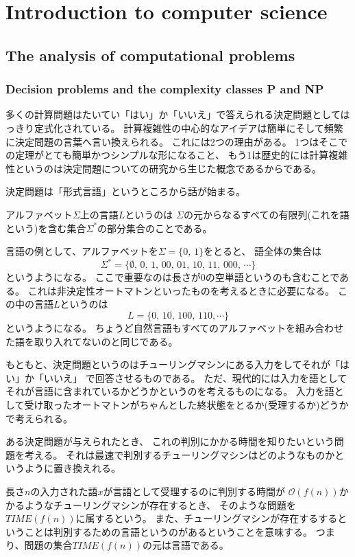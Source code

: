 \documentclass[../../master.tex]{subfiles}
\begin{document}
\setcounter{chapter}{2}
\chapter{Introduction to computer science}
\setcounter{section}{1}
\section{The analysis of computational problems}
\setcounter{subsection}{2}
\subsection{Decision problems and the complexity classes P and NP}
多くの計算問題はたいてい「はい」か「いいえ」で答えられる決定問題としてはっきり定式化されている。
計算複雑性の中心的なアイデアは簡単にそして頻繁に決定問題の言葉へ言い換えられる。
これには2つの理由がある。
1つはそこでの定理がとても簡単かつシンプルな形になること、
もう1は歴史的には計算複雑性というのは決定問題についての研究から生じた概念であるからである。

決定問題は「形式言語」というところから話が始まる。
\begin{tcolorbox}[title = 形式言語]
    アルファベット\(\Sigma\)上の言語\(L\)というのは
    \(\Sigma\)の元からなるすべての有限列(これを語という)を含む集合\(\Sigma^*\)の部分集合のことである。
\end{tcolorbox}
言語の例として、アルファベットを\(\Sigma=\{0,\,1\}\)をとると、
語全体の集合は
\[
    \Sigma^*=\{\emptyset,\,0,\,1,\,00,\,01,\,10,\,11,\,000,\,\cdots\}
\]
というようになる。
ここで重要なのは長さが0の空単語というのも含むことである。
これは非決定性オートマトンといったものを考えるときに必要になる。
この中の言語\(L\)というのは
\[
    L = \{0,\,10,\,100,\,110, \cdots\}
\]
というようになる。
ちょうど自然言語もすべてのアルファベットを組み合わせた語を取り入れてないのと同じである。

もともと、決定問題というのはチューリングマシンにある入力をしてそれが「はい」か「いいえ」
で回答させるものである。
ただ、現代的には入力を語としてそれが言語に含まれているかどうかというのを考えるものになる。
入力を語として受け取ったオートマトンがちゃんとした終状態をとるか(受理するか)どうかで考えられる。

ある決定問題が与えられたとき、
これの判別にかかる時間を知りたいという問題を考える。
それは最速で判別するチューリングマシンはどのようなものかというように置き換えれる。

\begin{tcolorbox}[title = 決定問題の分類]
    長さ\(n\)の入力された語\(x\)が言語として受理するのに判別する時間が
    \(\mathcal{O}(f(n))\)かかるようなチューリングマシンが存在するとき、
    そのような問題を\(TIME(f(n))\)に属するという。
    また、チューリングマシンが存在するするということは判別するための言語というのがあるということを意味する。
    つまり、問題の集合\(TIME(f(n))\)の元は言語である。
\end{tcolorbox}
\end{document}
